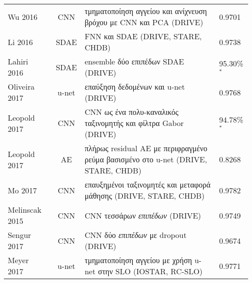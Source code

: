 \begin{sidewaystable}
\begin{tabular}{l c l l}
		Wu 2016~\cite{wu2016deep}                         & CNN             & τμηματοποίηση αγγείου και ανίχνευση βρόχου με CNN και PCA (DRIVE)                                             & 0.9701                                              \\
		Li 2016~\cite{li2016cross}                        & SDAE            & FNN και SDAE (DRIVE, STARE, CHDB)                                                                             & 0.9738                                              \\
		Lahiri 2016~\cite{lahiri2016deep}                 & SDAE            & ensemble δύο επιπέδων SDAE (DRIVE)                                                        & 95.30\%$^*$                                         \\
		Oliveira 2017~\cite{oliveira2017augmenting}       & u-net           & επαύξηση δεδομένων και u-net (DRIVE)                                                                          & 0.9768                                              \\
		Leopold 2017~\cite{leopold2017use}                & CNN             & CNN ως ένα πολυ-καναλικός ταξινομητής και φίλτρα Gabor (DRIVE)                                                & 94.78\%$^*$                                         \\
		Leopold 2017~\cite{leopold2017pixelbnn}           & AE              & πλήρως residual AE με περιφραγμένο ρεύμα βασισμένο στο u-net (DRIVE, STARE, CHDB)                             & 0.8268                                              \\
		Mo 2017~\cite{mo2017multi}                        & CNN             & επαυξημένοι ταξινομητές και μεταφορά μάθησης (DRIVE, STARE, CHDB)                                             & 0.9782                                              \\
		Melinscak 2015~\cite{melinvsvcak2015retinal}      & CNN             & CNN τεσσάρων \textit{επιπέδων} (DRIVE)                                                                        & 0.9749                                              \\
		Sengur 2017~\cite{sengur2017retinal}              & CNN             & CNN δύο \textit{επιπέδων} με dropout (DRIVE)                                                                  & 0.9674                                              \\
		Meyer 2017~\cite{meyer2017deep}                   & u-net           & τμηματοποίηση αγγείου με χρήση u-net στην SLO (IOSTAR, RC-SLO)                                                & 0.9771                                              \\
		\bottomrule
	\end{tabular}
\end{sidewaystable}

